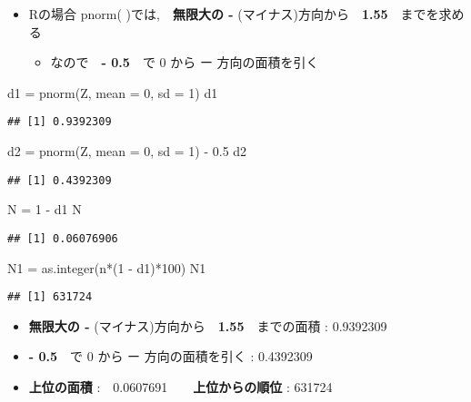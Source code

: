 \documentclass[
]{article}
\newenvironment{Shaded}{\begin{snugshade}}{\end{snugshade}}
\newcommand{\AttributeTok}[1]{\textcolor[rgb]{0.77,0.63,0.00}{#1}}
\newcommand{\DecValTok}[1]{\textcolor[rgb]{0.00,0.00,0.81}{#1}}
\newcommand{\FloatTok}[1]{\textcolor[rgb]{0.00,0.00,0.81}{#1}}
\newcommand{\FunctionTok}[1]{\textcolor[rgb]{0.00,0.00,0.00}{#1}}
\newcommand{\NormalTok}[1]{#1}
\newcommand{\OtherTok}[1]{\textcolor[rgb]{0.56,0.35,0.01}{#1}}
\newcommand{\SpecialCharTok}[1]{\textcolor[rgb]{0.00,0.00,0.00}{#1}}
\providecommand{\tightlist}{%
  \setlength{\itemsep}{0pt}\setlength{\parskip}{0pt}}
\begin{document}
\begin{itemize}
\item
  Rの場合 pnorm( )では,　\textbf{無限大の -}
  (マイナス)方向から　\textbf{1.55}　までを求める

  \begin{itemize}
  \tightlist
  \item
    なので　\textbf{- 0.5}　で 0 から ー 方向の面積を引く
  \end{itemize}
\end{itemize}

\begin{Shaded}
\begin{Highlighting}[]
\NormalTok{d1 }\OtherTok{=} \FunctionTok{pnorm}\NormalTok{(Z, }\AttributeTok{mean =} \DecValTok{0}\NormalTok{, }\AttributeTok{sd =} \DecValTok{1}\NormalTok{)}
\NormalTok{d1}
\end{Highlighting}
\end{Shaded}

\begin{verbatim}
## [1] 0.9392309
\end{verbatim}

\begin{Shaded}
\begin{Highlighting}[]
\NormalTok{d2 }\OtherTok{=} \FunctionTok{pnorm}\NormalTok{(Z, }\AttributeTok{mean =} \DecValTok{0}\NormalTok{, }\AttributeTok{sd =} \DecValTok{1}\NormalTok{) }\SpecialCharTok{{-}} \FloatTok{0.5}
\NormalTok{d2}
\end{Highlighting}
\end{Shaded}

\begin{verbatim}
## [1] 0.4392309
\end{verbatim}

\begin{Shaded}
\begin{Highlighting}[]
\NormalTok{N }\OtherTok{=} \DecValTok{1} \SpecialCharTok{{-}}\NormalTok{ d1}
\NormalTok{N}
\end{Highlighting}
\end{Shaded}

\begin{verbatim}
## [1] 0.06076906
\end{verbatim}

\begin{Shaded}
\begin{Highlighting}[]
\NormalTok{N1 }\OtherTok{=} \FunctionTok{as.integer}\NormalTok{(n}\SpecialCharTok{*}\NormalTok{(}\DecValTok{1} \SpecialCharTok{{-}}\NormalTok{ d1)}\SpecialCharTok{*}\DecValTok{100}\NormalTok{)}
\NormalTok{N1}
\end{Highlighting}
\end{Shaded}

\begin{verbatim}
## [1] 631724
\end{verbatim}

\begin{itemize}
\item
  \textbf{無限大の -} (マイナス)方向から　\textbf{1.55}　までの面積 :
  0.9392309
\item
  \textbf{- 0.5}　で 0 から ー 方向の面積を引く : 0.4392309
\item
  \textbf{上位の面積} :　0.0607691　\textbar{}　\textbf{上位からの順位}
  : 631724
\end{itemize}
\end{document}
